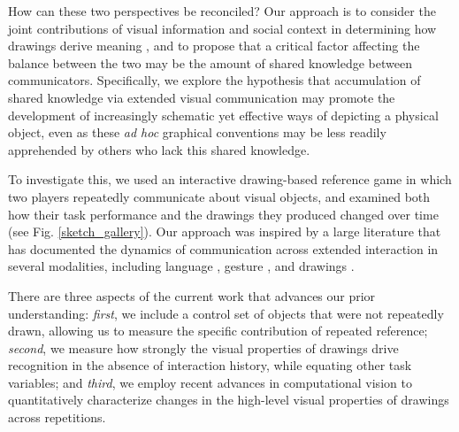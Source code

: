 \documentclass[10pt,letterpaper]{article}
\begin{document}
How can these two perspectives be reconciled? 
Our approach is to consider the joint contributions of visual information and social context in determining how drawings derive meaning \cite{fan2018modeling,abell2009canny}, and to propose that a critical factor affecting the balance between the two may be the amount of shared knowledge between communicators. 
Specifically, we explore the hypothesis that accumulation of shared knowledge via extended visual communication may promote the development of increasingly schematic yet effective ways of depicting a physical object, even as these \textit{ad hoc} graphical conventions may be less readily apprehended by others who lack this shared knowledge. 

To investigate this, we used an interactive drawing-based reference game in which two players repeatedly communicate about visual objects, and examined both how their task performance and the drawings they produced changed over time (see Fig. \ref{sketch_gallery}). 
Our approach was inspired by a large literature that has documented the dynamics of communication across extended interaction in several modalities, including language \cite{ClarkWilkesGibbs86_ReferringCollaborative,HawkinsFrankGoodman17_ConventionFormation}, gesture \cite{goldin1996silence,fay2014creating}, and drawings \cite{garrod_foundations_2007,fay2010interactive}.



There are three aspects of the current work that advances our prior understanding: \emph{first}, we include a control set of objects that were not repeatedly drawn, allowing us to measure the specific contribution of repeated reference; \emph{second}, we measure how strongly the visual properties of drawings drive recognition in the absence of interaction history, while equating other task variables; and \emph{third}, we employ recent advances in computational vision to quantitatively characterize changes in the high-level visual properties of drawings across repetitions. 
\end{document}
